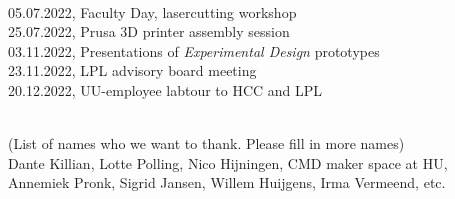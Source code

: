 \documentclass{report}
\begin{document}
 \\

05.07.2022, Faculty Day, lasercutting workshop\\
25.07.2022, Prusa 3D printer assembly session\\
03.11.2022, Presentations of \textit{Experimental Design} prototypes\\
23.11.2022, LPL advisory board meeting\\
20.12.2022, UU-employee labtour to HCC and LPL\\

\clearpage
\begin{figure}
    \centering
\end{figure}
\clearpage

 \\

(List of names who we want to thank. Please fill in more names)\\

Dante Killian, Lotte Polling, Nico Hijningen, CMD maker space at HU, Annemiek Pronk, Sigrid Jansen, Willem Huijgens, Irma Vermeend, etc.
\end{document}
